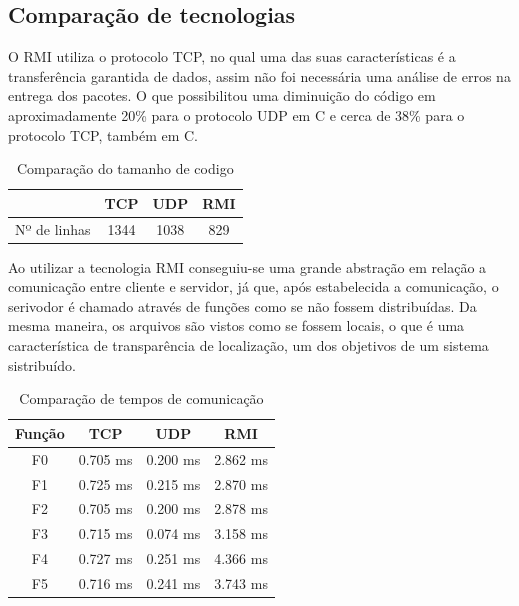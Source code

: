 \documentclass[10pt,a4paper]{article}
\begin{document}
\subsection{Comparação de tecnologias}
O RMI utiliza o protocolo TCP, no qual uma das suas características é 
a transferência garantida de dados, assim não foi necessária uma análise de erros na entrega
dos pacotes. O que possibilitou uma diminuição do código em aproximadamente 20\% para o protocolo UDP em C e cerca de 38\% para o protocolo TCP, também em C.

\begin{table}[h!]
  \begin{center}
  
    \begin{tabular}{cccc}
      
       & TCP&  UDP & RMI\\
      \hline
      Nº de linhas & 1344 & 1038 & 829 \\
    \end{tabular}
  \end{center}
      \vspace{-5mm}
    \caption{Comparação do tamanho de codigo} \label{compcom}
\end{table}

Ao utilizar a tecnologia RMI conseguiu-se uma grande abstração em relação a
comunicação entre cliente e servidor, já que, após estabelecida a comunicação, o serivodor
é chamado através de funções como se não fossem distribuídas. Da mesma maneira, os arquivos são vistos como se fossem locais,
o que é uma característica de transparência de localização, um dos objetivos de um sistema sistribuído. 

\begin{table}[h!]
  \begin{center}
  
    \begin{tabular}{cccc}
      
      Função& TCP&  UDP & RMI\\
      \hline
      F0 & 0.705 ms & 0.200 ms & 2.862 ms\\
      F1 & 0.725 ms & 0.215 ms & 2.870 ms\\
      F2 & 0.705 ms & 0.200 ms & 2.878 ms\\
      F3 & 0.715 ms & 0.074 ms & 3.158 ms\\
      F4 & 0.727 ms & 0.251 ms & 4.366 ms\\
      F5 & 0.716 ms & 0.241 ms & 3.743 ms
    \end{tabular}
  \end{center}
      \vspace{-5mm}
    \caption{Comparação de tempos de comunicação} \label{}
\end{table}
\end{document}
